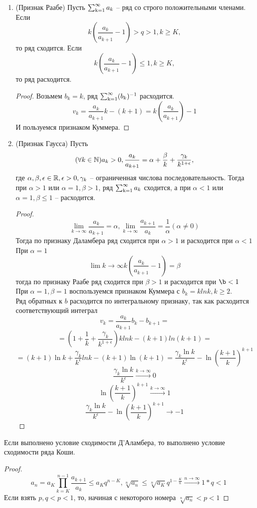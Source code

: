 \begin{enumerate}
\begin{proof}
т.е. $a_k b_k - a_{k+!}b_{k+1}\le 0 k \ge$. Значит, $$ \sum_{k=K}^{n-1} \big( a_k b_k-a_{k+1}b_{k+1} \big) = a_K b_K - a_n b_n \le 0, n>K$$
отсюда: $a_N \ge a_Kb_K - (b_n)^{-1}$. Из расходимости ряда $\ssum b_k$ следует расходимость ряда $\ssum a_k$
\end{proof}
\item
(Признак Раабе) Пусть $\ssum a_k$ -- ряд со строго положительными членами.
Если $$k \left( \frac{a_k}{a_{k+1}} -1 \right) > q > 1, k \ge K,$$
то ряд сходится.
Если $$k \left( \frac{a_k}{a_{k+1}} -1 \right) \le 1, k \ge K,$$
то ряд расходится.
\begin{proof}
Возьмем $b_k =k$, ряд $\operatorname{\sum_{k=1}^{\infty}} (b_k)^{-1}$ расходится.
$$v_k = \frac{a_k}{a_{k+1}}k - (k+1) = k (\frac{a_k}{a_{k+1}}) -1 $$
И пользуемся признаком Куммера.
\end{proof}
\item
(Признак Гаусса) Пусть 
$$(\forall k \in \operatorname{\mathbb{N}}) a_k>0, \frac{a_k}{a_{k+1}} = \alpha + \frac{\beta}{k}+\frac{\gamma_k}{k^{1+\epsilon}}, $$
где $\alpha, \beta, \epsilon \in \operatorname{\mathbb{R}}, \epsilon > 0, \gamma_k$ -- ограниченная числова последовательность.
Тогда при $\alpha > 1$ или $\alpha = 1, \beta > 1$, ряд $\ssum a_k$ сходится, а  при $\alpha < 1$ или $\alpha = 1, \beta \le 1$ -- расходится.
\begin{proof}
$$\lim_{k \to \infty} \frac{a_k}{a_{k+1}} = \alpha, \lim_{k \to \infty} \frac{a_{k+1}}{a_k} = \frac{1}{\alpha} (\alpha \not=0)$$
Тогда по признаку Даламбера ряд сходится при $\alpha > 1$ и расходится при $\alpha < 1$\\
При $\alpha = 1$\\
$$\lim{k \to \infty} k ( \frac{a_k}{a_{k+1}} -1 ) = \beta $$
тогда по признаку Раабе ряд сходится при $\beta > 1$ и расходится при $\b < 1$\\
При $\alpha =1, \beta =1$ воспользуемся признаком Куммера с $b_k = k ln k, k\ge 2.$\\
Ряд обратных к $b$ расходится по интегральному признаку, так как расходится соответствующий интеграл
$$v_k = \frac{a_k}{a_{k+1}}b_k - b_{k+1} =$$
$$= \left(1 + \frac{1}{k} + \frac{\gamma_k}{k^{1+\epsilon}} \right) k lnk - (k+1)ln(k+1) =$$
$$=(k+1)\ln k + \frac{\gamma_k}{k^{\epsilon}}ln k - (k+1)\ln(k+1) = \frac{\gamma_k \ln k}{k^{\epsilon}} - \ln(\frac{k+1}{k})^{k+1}$$
$$\frac{\gamma_k \ln k}{k^{\epsilon}} \xrightarrow{k \to \infty} 0$$
$$\ln(\frac{k+1}{k})^{k+1} \xrightarrow{k \to \infty} 1$$
$$\frac{\gamma_k \ln k}{k^{\epsilon}} - \ln(\frac{k+1}{k})^{k+1} \to -1 $$
\end{proof}
\end{enumerate}
\begin{thm}
Если выполнено условие сходимости Д'Аламбера, то выполнено условие сходимости ряда Коши.
\end{thm}
\begin{proof}
$$a_n = a_K \prod_{k=K}^{n-1} \frac{a_{k+1}}{a_k} \le a_K q^{n-K}, \sqrt[n]{a_n} \le \sqrt[n]{a_K}q^{1-\frac{K}{n}} \xrightarrow{n \to \infty} 1*q < 1$$
Если взять $p, q<p<1$, то, начиная с некоторого номера $\sqrt[n]{a_n}<p<1$
\end{proof}